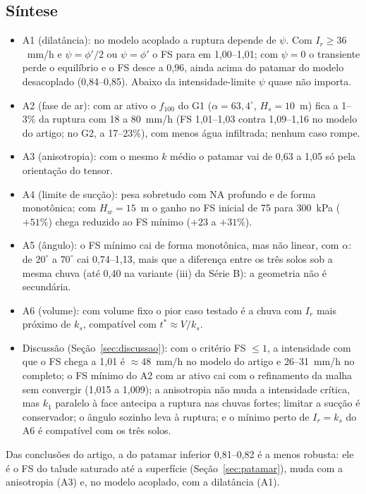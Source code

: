 \subsection{S\'intese}

\begin{itemize}
\item A1 (dilat\^ancia): no modelo acoplado a ruptura depende de $\psi$. Com $I_r\ge36$~mm/h e $\psi=\phi'/2$ ou
$\psi=\phi'$ o FS para em 1,00--1,01; com $\psi=0$ o transiente perde o equil\'ibrio e o FS desce a 0,96, ainda acima
do patamar do modelo desacoplado (0,84--0,85). Abaixo da intensidade-limite $\psi$ quase n\~ao importa.
\item A2 (fase de ar): com ar ativo o $f_{100}$ do G1 ($\alpha=63{,}4^\circ$, $H_s=10$~m) fica a 1--3\% da ruptura com
18 a 80~mm/h (FS 1,01--1,03 contra 1,09--1,16 no modelo do artigo; no G2, a 17--23\%), com menos \'agua infiltrada;
nenhum caso rompe.
\item A3 (anisotropia): com o mesmo $k$ m\'edio o patamar vai de 0,63 a 1,05 s\'o pela orienta\c{c}\~ao do tensor.
\item A4 (limite de suc\c{c}\~ao): pesa sobretudo com NA profundo e de forma monot\^onica; com $H_w=15$~m o ganho no FS
inicial de 75 para 300~kPa ($+51\%$) chega reduzido ao FS m\'inimo ($+23$ a $+31\%$).
\item A5 (\^angulo): o FS m\'inimo cai de forma monot\^onica, mas n\~ao linear, com $\alpha$: de $20^\circ$ a $70^\circ$
cai 0,74--1,13, mais que a diferen\c{c}a entre os tr\^es solos sob a mesma chuva (at\'e 0,40 na variante (iii) da
S\'erie B): a geometria n\~ao \'e secund\'aria.
\item A6 (volume): com volume fixo o pior caso testado \'e a chuva com $I_r$ mais pr\'oximo de $k_s$, compat\'ivel com
$t^*\approx V/k_s$.
\item Discuss\~ao (Se\c{c}\~ao~\ref{sec:discussao}): com o crit\'erio FS $\le1$, a intensidade com que o FS chega a
1,01 \'e $\approx48$~mm/h no modelo do artigo e 26--31~mm/h no completo; o FS m\'inimo do A2 com ar ativo cai com o
refinamento da malha sem convergir (1,015 a 1,009); a anisotropia n\~ao muda a intensidade cr\'itica, mas $k_1$ paralelo
\`a face antecipa a ruptura nas chuvas fortes; limitar a suc\c{c}\~ao \'e conservador; o \^angulo sozinho leva \`a ruptura;
e o m\'inimo perto de $I_r=k_s$ do A6 \'e compat\'ivel com os tr\^es solos.
\end{itemize}
Das conclus\~oes do artigo, a do patamar inferior 0,81--0,82 \'e a menos robusta: ele \'e o FS do talude saturado at\'e
a superf\'icie (Se\c{c}\~ao~\ref{sec:patamar}), muda com a anisotropia (A3) e, no modelo acoplado, com a dilat\^ancia
(A1).

